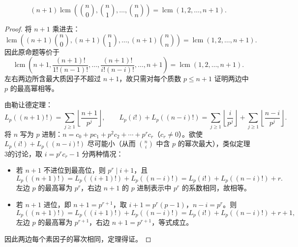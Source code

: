 \begin{theorem}
\[
(n+1)\operatorname{lcm}\left(\binom{n}{0}, \binom{n}{1}, \ldots, \binom{n}{n}\right) = \operatorname{lcm}(1,2,\ldots,n+1).
\]
\end{theorem}

\begin{proof}
将 $n+1$ 乘进去：
\[
\operatorname{lcm}\left((n+1)\binom{n}{0}, (n+1)\binom{n}{1}, \ldots, (n+1)\binom{n}{n}\right) = \operatorname{lcm}(1,2,\ldots,n+1).
\]
因此原命题等价于
\[
\operatorname{lcm}\left(n+1, \frac{(n+1)!}{1!(n-1)!}, \ldots, \frac{(n+1)!}{i!(n-i)!}, \ldots, n+1\right) = \operatorname{lcm}(1,2,\ldots,n+1).
\]
左右两边所含最大质因子不超过 $n+1$，故只需对每个质数 $p \le n+1$ 证明两边中 $p$ 的最高幂相等。

由勒让德定理：
\[
L_p((n+1)!) = \sum_{j\ge1}\left\lfloor\frac{n+1}{p^j}\right\rfloor,\qquad
L_p(i!)+L_p((n-i)!) = \sum_{j\ge1}\left\lfloor\frac{i}{p^j}\right\rfloor + \sum_{j\ge1}\left\lfloor\frac{n-i}{p^j}\right\rfloor.
\]
将 $n$ 写为 $p$ 进制：$n = c_0 + pc_1 + p^2c_2 + \cdots + p^r c_r$（$c_r \neq 0$）。欲使 $L_p(i!)+L_p((n-i)!)$ 尽可能小（从而 $\binom{n}{i}$ 中含 $p$ 的幂次最大），类似定理3的讨论，取 $i = p^r c_r - 1$ 分两种情况：
\begin{itemize}
\item 若 $n+1$ 不进位到最高位，则 $p^r \mid i+1$，且
\[
L_p((n+1)!) = L_p((i+1)!)+L_p((n-i)!)=L_p(i!)+L_p((n-i)!)+r.
\]
左边 $p$ 的最高幂为 $p^r$，右边 $n+1$ 的 $p$ 进制表示中 $p^r$ 的系数相同，故相等。
\item 若 $n+1$ 进位，即 $n+1 = p^{r+1}$，取 $i+1 = p^r(p-1)$，$n-i = p^r$。则
\[
L_p((n+1)!) = L_p((i+1)!)+L_p((n-i)!)=L_p(i!)+L_p((n-i)!)+r+1,
\]
左边 $p$ 的最高幂为 $p^{r+1}$，右边 $n+1 = p^{r+1}$，等式成立。
\end{itemize}
因此两边每个素因子的幂次相同，定理得证。
\end{proof}